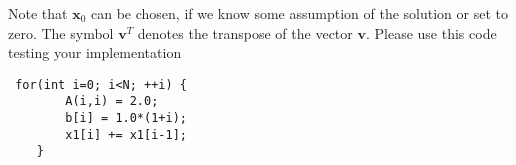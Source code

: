 \documentclass[11pt]{article}
\begin{document}
\begin{enumerate}
Note that $\mathbf{x}_0$ can be chosen, if we know some assumption of the solution or set to zero. The symbol $\mathbf{v}^T$ denotes the transpose of the vector $\mathbf{v}$. Please use this code testing your implementation
\begin{lstlisting}
 for(int i=0; i<N; ++i) {
        A(i,i) = 2.0;
        b[i] = 1.0*(1+i);
        x1[i] += x1[i-1];
    }
\end{lstlisting}




\end{enumerate}
\doclicenseThis 
\end{document}
